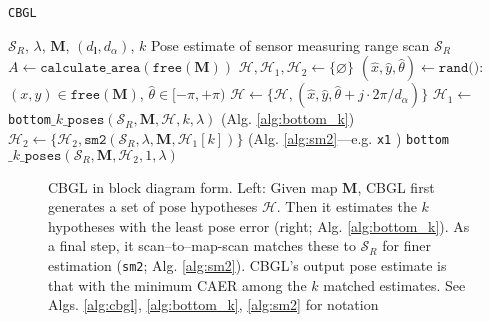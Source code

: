 \begin{algorithm}[]
  \caption{\texttt{CBGL}}
  \begin{spacing}{1.0}
  \begin{algorithmic}[1]
    \REQUIRE $\mathcal{S}_R$, $\lambda$, $\bm{M}$, $(d_{\bm{l}}, d_\alpha)$, $k$
    \ENSURE Pose estimate of sensor measuring range scan $\mathcal{S}_R$ %
    \STATE $A \leftarrow \texttt{calculate\_area}(\texttt{free}(\bm{M}))$
    \STATE $\mathcal{H}, \mathcal{H}_1, \mathcal{H}_2 \leftarrow \{\varnothing\}$
      \STATE \small $(\hat{x},\hat{y},\hat{\theta}) \leftarrow \texttt{rand()}$: $(x,y) \in \texttt{free}(\bm{M})$, $\hat{\theta} \in [-\pi,+\pi)$
        \STATE $\mathcal{H} \leftarrow \{\mathcal{H}, (\hat{x}, \hat{y}, \hat{\theta} + j \cdot 2\pi / d_{\alpha})\}$     \label{alg:cbgl:h}
      \ENDFOR
    \ENDFOR
    \STATE $\mathcal{H}_1 \leftarrow$ \texttt{bottom}$\_k\_\texttt{poses}(\mathcal{S}_R, \bm{M}, \mathcal{H}, k, \lambda)$ \hfill {\small (Alg. \ref{alg:bottom_k}}) \label{alg:cbgl:h1}
      \STATE \footnotesize $\mathcal{H}_2 \leftarrow \{\mathcal{H}_2, \texttt{sm2}(\mathcal{S}_R, \lambda, \bm{M}, \mathcal{H}_1[k])\}$ \hfill {(Alg. \ref{alg:sm2}---e.g. \texttt{x1} \cite{Filotheou2023a})}\label{alg:cbgl:h2}
    \ENDFOR
    \RETURN \texttt{bottom}$\_k\_\texttt{poses}(\mathcal{S}_R, \bm{M}, \mathcal{H}_2, 1, \lambda)$
  \end{algorithmic}
  \end{spacing}
  \label{alg:cbgl}
\end{algorithm}




\begin{figure}\vspace{-0.4cm}
  \subfloat{\label{fig:cbgl}     }
  \subfloat{\label{fig:bottom_k} }
  \caption{\small CBGL in block diagram form. Left: Given map $\bm{M}$, CBGL
           first generates a set of pose hypotheses $\mathcal{H}$. Then it
           estimates the $k$ hypotheses with the least pose error (right; Alg.
           \ref{alg:bottom_k}).
           As a final step, it scan--to--map-scan
           matches these to $\mathcal{S}_R$ for finer estimation
           (\texttt{sm2}; Alg.
           \ref{alg:sm2}).
           CBGL's output pose estimate is that with
           the minimum CAER among the $k$ matched estimates. See Algs.
           \ref{alg:cbgl}, \ref{alg:bottom_k}, \ref{alg:sm2} for notation
           }
  \label{fig:block_system}
\end{figure}





